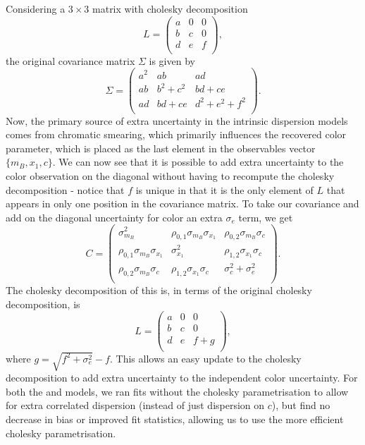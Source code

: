 \documentclass[twocolumn,trackchanges,tighten]{aastex62}
\newcommand{\gten}{\citetalias{Guy2010}}
\newcommand{\celeven}{\citetalias{Chotard2011}}
\begin{document}
Considering a $3\times3$ matrix with cholesky decomposition
\begin{equation}
L = \begin{pmatrix}
a & 0 & 0 \\ b & c & 0 \\ d & e & f \\
\end{pmatrix},
\end{equation}
the original covariance matrix $\Sigma$ is given by
\begin{equation}
\Sigma = \begin{pmatrix}
a^2 & ab & ad \\ ab & b^2 + c^2 & bd + ce \\ ad & bd + ce & d^2 + e^2 + f^2\\
\end{pmatrix}.
\end{equation}
Now, the primary source of extra uncertainty in the intrinsic dispersion models comes from chromatic smearing, which primarily influences the recovered color parameter, which is placed as the last element in the observables vector $\lbrace m_B, x_1, c\rbrace$. We can now see that it is possible to add extra uncertainty to the color observation on the diagonal without having to recompute the cholesky decomposition - notice that $f$ is unique in that it is the only element of $L$ that appears in only one position in the covariance matrix. To take our covariance and add on the diagonal uncertainty for color an extra $\sigma_e$ term, we get
\begin{equation}
C = \begin{pmatrix}
\sigma_{m_B}^2 & \rho_{0,1} \sigma_{m_B} \sigma_{x_1} & \rho_{0,2} \sigma_{m_B} \sigma_c \\
\rho_{0,1} \sigma_{m_B} \sigma_{x_1} & \sigma_{x_1}^2 & \rho_{1, 2} \sigma_{x_1} \sigma_c \\
\rho_{0,2} \sigma_{m_B} \sigma_c & \rho_{1, 2} \sigma_{x_1} \sigma_c &  \sigma_c^2 + \sigma_e^2 \\
\end{pmatrix}.
\end{equation}
The cholesky decomposition of this is, in terms of the original cholesky decomposition, is
\begin{equation}
L = \begin{pmatrix}
a & 0 & 0 \\ b & c & 0 \\ d & e & f + g \\
\end{pmatrix},
\end{equation}
where $g = \sqrt{f^2 + \sigma_e^2} - f$. This allows an easy update to the cholesky decomposition to add extra uncertainty to the independent color uncertainty. For both the {\gten} and {\celeven} models, we ran fits without the cholesky parametrisation to allow for extra correlated dispersion (instead of just dispersion on $c$), but find no decrease in bias or improved fit statistics, allowing us to use the more efficient cholesky parametrisation.
\end{document}

